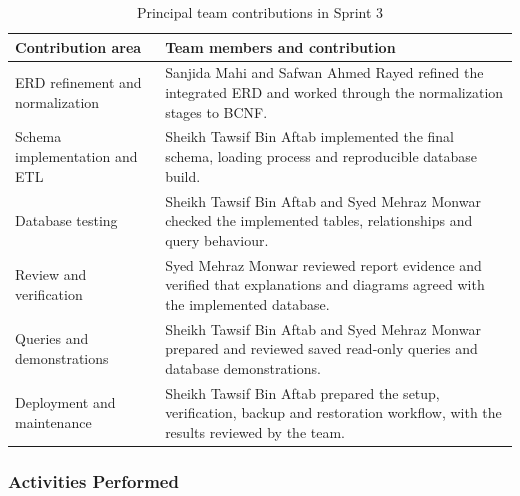 \begin{table}[H]
\centering
\caption{Principal team contributions in Sprint 3}
\label{tab:sprint3-contributions}
\begin{tabular}{L{0.26\textwidth}L{0.63\textwidth}}
\toprule
Contribution area & Team members and contribution \\
\midrule
ERD refinement and normalization & Sanjida Mahi and Safwan Ahmed Rayed refined
the integrated ERD and worked through the normalization stages to BCNF. \\
Schema implementation and ETL & Sheikh Tawsif Bin Aftab implemented the final
schema, loading process and reproducible database build. \\
Database testing & Sheikh Tawsif Bin Aftab and Syed Mehraz Monwar checked the
implemented tables, relationships and query behaviour. \\
Review and verification & Syed Mehraz Monwar reviewed report evidence and
verified that explanations and diagrams agreed with the implemented database. \\
Queries and demonstrations & Sheikh Tawsif Bin Aftab and Syed Mehraz Monwar
prepared and reviewed saved read-only queries and database demonstrations. \\
Deployment and maintenance & Sheikh Tawsif Bin Aftab prepared the setup,
verification, backup and restoration workflow, with the results reviewed
by the team. \\
\bottomrule
\end{tabular}
\end{table}

\subsubsection{Activities Performed}

